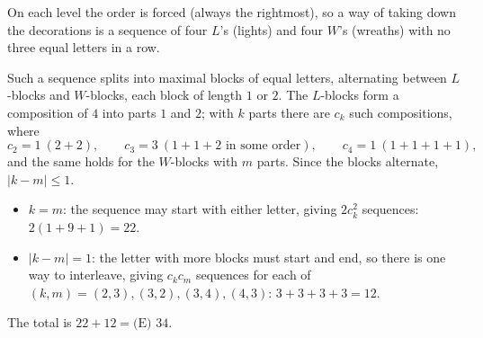 On each level the order is forced (always the rightmost), so a way of taking down the decorations is a sequence of four $L$'s (lights) and four $W$'s (wreaths) with no three equal letters in a row.

Such a sequence splits into maximal blocks of equal letters, alternating between $L$-blocks and $W$-blocks, each block of length $1$ or $2$. The $L$-blocks form a composition of $4$ into parts $1$ and $2$; with $k$ parts there are $c_k$ such compositions, where
\[
c_2=1\ (2+2),\qquad c_3=3\ (1+1+2\text{ in some order}),\qquad c_4=1\ (1+1+1+1),
\]
and the same holds for the $W$-blocks with $m$ parts. Since the blocks alternate, $|k-m|\le1$.
\begin{itemize}
\item $k=m$: the sequence may start with either letter, giving $2c_k^2$ sequences: $2(1+9+1)=22$.
\item $|k-m|=1$: the letter with more blocks must start and end, so there is one way to interleave, giving $c_kc_m$ sequences for each of $(k,m)=(2,3),(3,2),(3,4),(4,3)$: $3+3+3+3=12$.
\end{itemize}
The total is $22+12=\boxed{\text{(E) }34}$.
